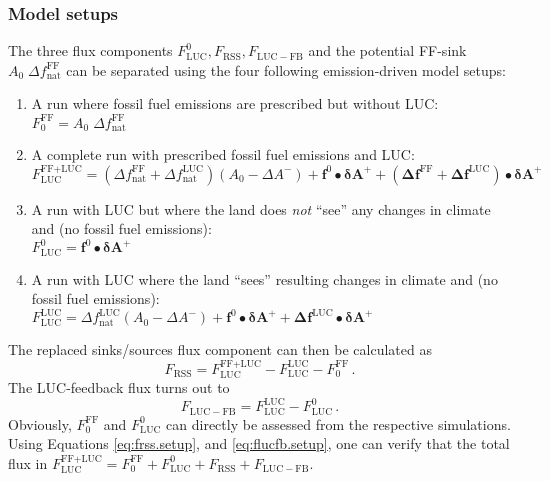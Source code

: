 \subsubsection{Model setups}
\label{sec:lucdef.setups}
The three flux components $F^0_{\mathrm{LUC}}, F_{\mathrm{RSS}}, F_{\mathrm{LUC-FB}}$ and the potential FF-sink $A_0 \; \Delta f^{\text{FF}}_{\text{nat}}$ can be separated using the four following emission-driven model setups:
\begin{enumerate}
\item A run where fossil fuel emissions are prescribed but without LUC: \\$F_0^{\text{FF}} = A_0 \; \Delta f^{\text{FF}}_{\text{nat}}$
\item A complete run with prescribed fossil fuel emissions and LUC: \\$F_{\text{LUC}}^{\text{FF+LUC}} = (\Delta f^{\text{FF}}_{\text{nat}} + \Delta f^{\text{LUC}}_{\text{nat}}) (A_0 - \Delta A^-) + \mathbf{f}^0 \bullet  \mathbf{\delta A^{+}} + (\mathbf{\Delta f}^{\text{FF}} + \mathbf{\Delta f}^{\text{LUC}}) \bullet  \mathbf{\delta A^{+}} $
\item A run with LUC but where the land does {\it not} ``see'' any changes in climate and \coo (no fossil fuel emissions):\\$F_{\text{LUC}}^0 = \mathbf{f}^0 \bullet  \mathbf{\delta A^{+}}$
\item A run with LUC where the land ``sees'' resulting changes in climate and \coo (no fossil fuel emissions):\\$F_{\text{LUC}}^{\text{LUC}} =  \Delta f^{\text{LUC}}_{\text{nat}} (A_0 - \Delta A^-) + \mathbf{f}^0 \bullet  \mathbf{\delta A^{+}} + \mathbf{\Delta f}^{\text{LUC}} \bullet  \mathbf{\delta A^{+}}$
\end{enumerate}
The replaced sinks/sources flux component can then be calculated as 
\begin{equation}
F_{\mathrm{RSS}} = F_{\text{LUC}}^{\text{FF+LUC}} - F_{\text{LUC}}^{\text{LUC}} - F_0^{\text{FF}}\,.
\label{eq:frss.setup}
\end{equation}
The LUC-feedback flux turns out to
\begin{equation}
F_{\mathrm{LUC-FB}} = F_{\text{LUC}}^{\text{LUC}} - F_{\text{LUC}}^0\,.
\label{eq:flucfb.setup}
\end{equation}
Obviously, $F_0^{\text{FF}}$ and $F^0_{\mathrm{LUC}}$ can directly be assessed from the respective simulations. Using Equations \ref{eq:frss.setup}, and \ref{eq:flucfb.setup}, one can verify that the total flux in $F_{\text{LUC}}^{\text{FF+LUC}} = F_0^{\text{FF}} + F_{\text{LUC}}^0 + F_{\mathrm{RSS}} + F_{\mathrm{LUC-FB}}$.

